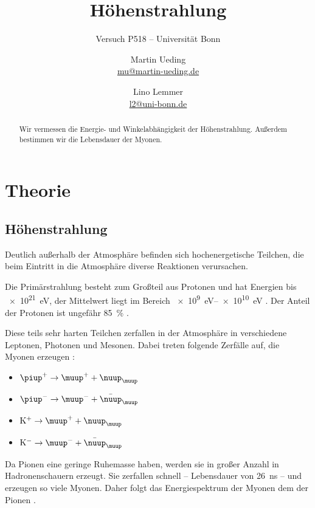 \documentclass[11pt, ngerman, fleqn, DIV=15, headinclude, BCOR=2cm]{scrreprt}
\title{Höhenstrahlung}
\subtitle{Versuch P518 -- Universität Bonn}
\author{
    Martin Ueding \\ \small{\href{mailto:mu@martin-ueding.de}{mu@martin-ueding.de}}
    \and
    Lino Lemmer \\
    \small{\href{mailto:l2@uni-bonn.de}{l2@uni-bonn.de}}
}
\date{\daterange{2014-07-02}{2014-07-03}}
\begin{document}
\maketitle

\begin{abstract}
    Wir vermessen die Energie- und Winkelabhängigkeit der Höhenstrahlung.
    Außerdem bestimmen wir die Lebensdauer der Myonen.
\end{abstract}

\tableofcontents

\chapter{Theorie}

\section{Höhenstrahlung}

Deutlich außerhalb der Atmosphäre befinden sich hochenergetische Teilchen, die
beim Eintritt in die Atmosphäre diverse Reaktionen verursachen.

Die Primärstrahlung besteht zum Großteil aus Protonen und hat Energien bis
\SI{e21}{\electronvolt}, der Mittelwert liegt im Bereich
\SIrange{e9}{e10}{\electronvolt} \parencite[983]{meschede-gerthsen_24}. Der
Anteil der Protonen ist ungefähr \SI{85}{\percent}
\parencite[110]{Grupen/Astroteilchenphysik}.

Diese teils sehr harten Teilchen zerfallen in der Atmosphäre in verschiedene
Leptonen, Photonen und Mesonen. Dabei treten folgende Zerfälle auf, die Myonen
erzeugen \parencite[111]{Grupen/Astroteilchenphysik}:

\label{sec:muon-channels}
\begin{itemize}
    \item
        $\piup^+ \to \muup^+ + \nuup_\muup$
    \item
        $\piup^- \to \muup^- + \bar \nuup_\muup$
    \item
        $\mathrm K^+ \to \muup^+ + \nuup_\muup$
    \item
        $\mathrm K^- \to \muup^- + \bar \nuup_\muup$
\end{itemize}

Da Pionen eine geringe Ruhemasse haben, werden sie in großer Anzahl in
Hadronenschauern erzeugt. Sie zerfallen schnell – Lebensdauer von
\SI{26}{\nano\second} \parencite[111]{Grupen/Astroteilchenphysik} – und
erzeugen so viele Myonen. Daher folgt das Energiespektrum der Myonen dem der
Pionen \parencite[113]{Grupen/Astroteilchenphysik}.
\end{document}
